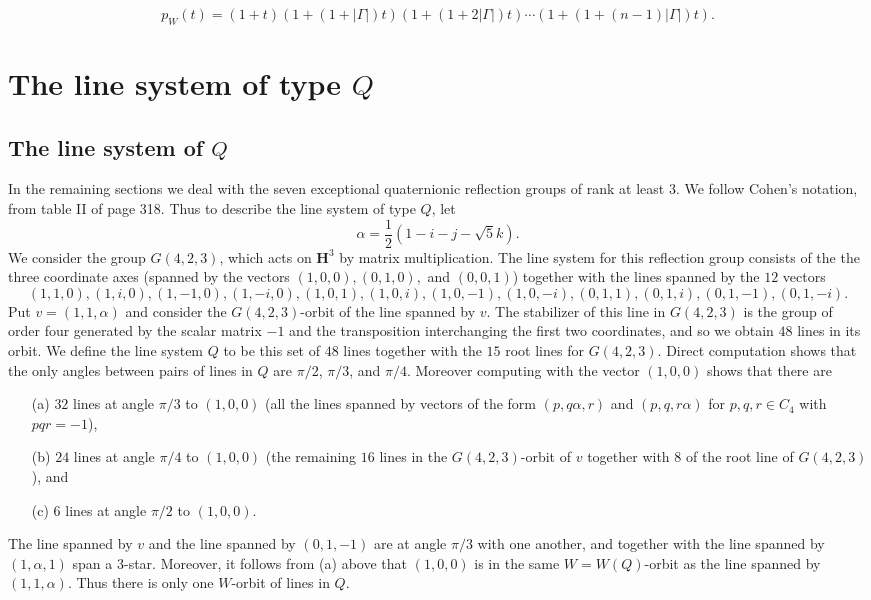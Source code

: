 \documentclass[11pt, reqno]{amsart}
\numberwithin{equation}{section}
\theoremstyle{definition}
\theoremstyle{plain}
\newcommand{\HH}{\mathbf{H}}
\begin{document}
$$p_W(t)=(1+t)(1+(1+|\Gamma|) t)(1+(1+2 |\Gamma|)t) \cdots (1+(1+(n-1) |\Gamma|) t).$$

\section{The line system of type $Q$} 

\subsection{The line system of $Q$} In the remaining sections we deal with the seven exceptional quaternionic reflection groups of rank at least $3$. We follow Cohen's \cite{Coh} notation, from table II of page 318. Thus to describe the line system of type $Q$, let $$\alpha=\frac{1}{2}(1-i-j-\sqrt{5}k).$$ We consider the group $G(4,2,3)$, which acts on $\HH^3$ by matrix multiplication. The line system for this reflection group consists of the the three coordinate axes (spanned by the vectors $(1,0,0),(0,1,0),$ and $(0,0,1)$) together with the lines spanned by the $12$ vectors
$$(1,1,0),(1,i,0),(1,-1,0),(1,-i,0),(1,0,1),(1,0,i),(1,0,-1),(1,0,-i),(0,1,1),(0,1,i),(0,1,-1),(0,1,-i).$$ Put $v=(1,1,\alpha)$ and consider the $G(4,2,3)$-orbit of the line spanned by $v$. The stabilizer of this line in $G(4,2,3)$ is the group of order four generated by the scalar matrix $-1$ and the transposition interchanging the first two coordinates, and so we obtain $48$ lines in its orbit. We define the line system $Q$ to be this set of $48$ lines together with the $15$ root lines for $G(4,2,3)$. Direct computation shows that the only angles between pairs of lines in $Q$ are $\pi/2$, $\pi/3$, and $\pi/4$. Moreover computing with the vector $(1,0,0)$ shows that there are
\begin{itemize}
\item[(a)] $32$ lines at angle $\pi/3$ to $(1,0,0)$ (all the lines spanned by vectors of the form $(p,q\alpha,r)$ and $(p,q,r\alpha)$ for $p,q,r \in C_4$ with $pqr=-1$),
\item[(b)] $24$ lines at angle $\pi/4$ to $(1,0,0)$ (the remaining $16$ lines in the $G(4,2,3)$-orbit of $v$ together with $8$ of the root line of $G(4,2,3)$), and
\item[(c)] $6$ lines at angle $\pi/2$ to $(1,0,0)$. 
\end{itemize} 

The line spanned by $v$ and the line spanned by $(0,1,-1)$ are at angle $\pi/3$ with one another, and together with the line spanned by $(1,\alpha,1)$ span a $3$-star. Moreover, it follows from (a) above that $(1,0,0)$ is in the same $W=W(Q)$-orbit as the line spanned by $(1,1,\alpha)$. Thus there is only one $W$-orbit of lines in $Q$.
\end{document}
